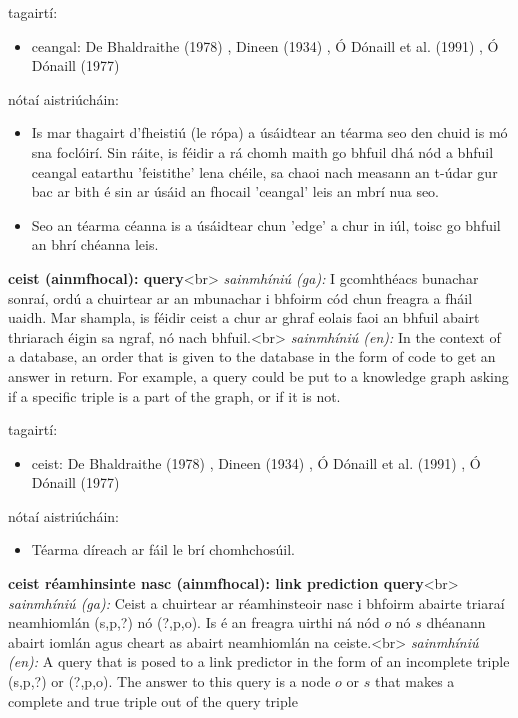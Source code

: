 \documentclass{article}
\begin{document}
tagairtí:
\begin{itemize}
	\item ceangal: De Bhaldraithe (1978) \cite{de-bhaldraithe}, Dineen (1934) \cite{dineen}, Ó Dónaill et al. (1991) \cite{focloir-beag}, Ó Dónaill (1977) \cite{odonaill}
\end{itemize}

nótaí aistriúcháin:
\begin{itemize}
	\item Is mar thagairt d'fheistiú (le rópa) a úsáidtear an téarma seo den chuid is mó sna foclóirí. Sin ráite, is féidir a rá chomh maith go bhfuil dhá nód a bhfuil ceangal eatarthu 'feistithe' lena chéile, sa chaoi nach measann an t-údar gur bac ar bith é sin ar úsáid an fhocail 'ceangal' leis an mbrí nua seo.
	\item Seo an téarma céanna is a úsáidtear chun 'edge' a chur in iúl, toisc go bhfuil an bhrí chéanna leis.
\end{itemize}


\textbf{ceist (ainmfhocal): query}<br>
\textit{sainmhíniú (ga):} I gcomhthéacs bunachar sonraí, ordú a chuirtear ar an mbunachar i bhfoirm cód chun freagra a fháil uaidh. Mar shampla, is féidir ceist a chur ar ghraf eolais faoi an bhfuil abairt thriarach éigin sa ngraf, nó nach bhfuil.<br>
\textit{sainmhíniú (en):} In the context of a database, an order that is given to the database in the form of code to get an answer in return. For example, a query could be put to a knowledge graph asking if a specific triple is a part of the graph, or if it is not.

tagairtí:
\begin{itemize}
	\item ceist: De Bhaldraithe (1978) \cite{de-bhaldraithe}, Dineen (1934) \cite{dineen}, Ó Dónaill et al. (1991) \cite{focloir-beag}, Ó Dónaill (1977) \cite{odonaill}
\end{itemize}

nótaí aistriúcháin:
\begin{itemize}
	\item Téarma díreach ar fáil le brí chomhchosúil.
\end{itemize}


\textbf{ceist réamhinsinte nasc (ainmfhocal): link prediction query}<br>
\textit{sainmhíniú (ga):} Ceist a chuirtear ar réamhinsteoir nasc i bhfoirm abairte triaraí neamhiomlán (s,p,?) nó (?,p,o). Is é an freagra uirthi ná nód $o$ nó $s$ dhéanann abairt iomlán agus cheart as abairt neamhiomlán na ceiste.<br>
\textit{sainmhíniú (en):} A query that is posed to a link predictor in the form of an incomplete triple (s,p,?) or (?,p,o). The answer to this query is a node $o$ or $s$ that makes a complete and true triple out of the query triple
\end{document}
